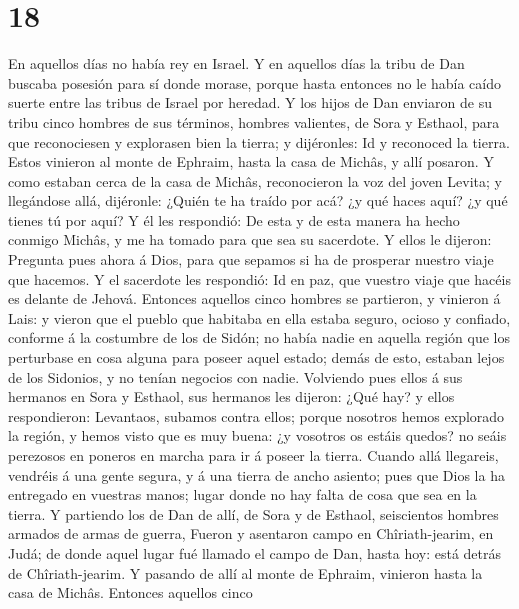 \hypertarget{section-17}{%
\section{18}\label{section-17}}

 En aquellos días no había rey en Israel. Y en aquellos días
la tribu de Dan buscaba posesión para sí donde morase, porque hasta
entonces no le había caído suerte entre las tribus de Israel por
heredad.  Y los hijos de Dan enviaron de su tribu cinco
hombres de sus términos, hombres valientes, de Sora y Esthaol, para que
reconociesen y explorasen bien la tierra; y dijéronles: Id y reconoced
la tierra. Estos vinieron al monte de Ephraim, hasta la casa de Michâs,
y allí posaron.  Y como estaban cerca de la casa de Michâs,
reconocieron la voz del joven Levita; y llegándose allá, dijéronle:
¿Quién te ha traído por acá? ¿y qué haces aquí? ¿y qué tienes tú por
aquí?  Y él les respondió: De esta y de esta manera ha hecho
conmigo Michâs, y me ha tomado para que sea su sacerdote.  Y
ellos le dijeron: Pregunta pues ahora á Dios, para que sepamos si ha de
prosperar nuestro viaje que hacemos.  Y el sacerdote les
respondió: Id en paz, que vuestro viaje que hacéis es delante de Jehová.
 Entonces aquellos cinco hombres se partieron, y vinieron á
Lais: y vieron que el pueblo que habitaba en ella estaba seguro, ocioso
y confiado, conforme á la costumbre de los de Sidón; no había nadie en
aquella región que los perturbase en cosa alguna para poseer aquel
estado; demás de esto, estaban lejos de los Sidonios, y no tenían
negocios con nadie.  Volviendo pues ellos á sus hermanos en
Sora y Esthaol, sus hermanos les dijeron: ¿Qué hay? y ellos
respondieron:  Levantaos, subamos contra ellos; porque
nosotros hemos explorado la región, y hemos visto que es muy buena: ¿y
vosotros os estáis quedos? no seáis perezosos en poneros en marcha para
ir á poseer la tierra.  Cuando allá llegareis, vendréis á
una gente segura, y á una tierra de ancho asiento; pues que Dios la ha
entregado en vuestras manos; lugar donde no hay falta de cosa que sea en
la tierra.  Y partiendo los de Dan de allí, de Sora y de
Esthaol, seiscientos hombres armados de armas de guerra, 
Fueron y asentaron campo en Chîriath-jearim, en Judá; de donde aquel
lugar fué llamado el campo de Dan, hasta hoy: está detrás de
Chîriath-jearim.  Y pasando de allí al monte de Ephraim,
vinieron hasta la casa de Michâs.  Entonces aquellos cinco
